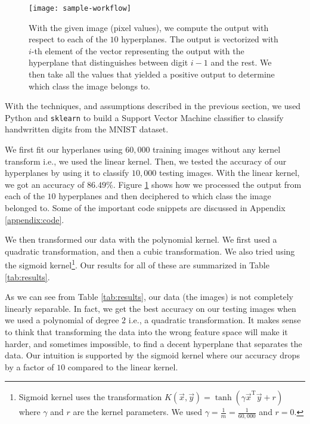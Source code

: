 
\begin{figure}[!tb]
	\texttt{[image: sample-workflow]}
	\centering
	\caption{With the given image (pixel values), we compute the output with respect to each of the $10$ hyperplanes. The output is vectorized with $i$-th element of the vector representing the output with the hyperplane that distinguishes between digit $i-1$ and the rest. We then take all the values that yielded a positive output to determine which class the image belongs to.}
	\label{fig:workflow}
\end{figure}

With the techniques, and assumptions described in the previous section, we used Python and \texttt{sklearn} to build a Support Vector Machine classifier to classify handwritten digits from the MNIST dataset.

We first fit our hyperlanes using $60,000$ training images without any kernel transform i.e., we used the linear kernel. Then, we tested the accuracy of our hyperplanes by using it to classify $10,000$ testing images. With the linear kernel, we got an accuracy of $86.49 \%$. Figure \ref{fig:workflow} shows how we processed the output from each of the $10$ hyperplanes and then deciphered to which class the image belonged to. Some of the important code snippets are discussed in Appendix \ref{appendix:code}.

We then transformed our data with the polynomial kernel. We first used a quadratic transformation, and then a cubic transformation. We also tried using the sigmoid kernel\footnote{Sigmoid kernel uses the transformation $K(\vec{x}, \vec{y}) = \tanh(\gamma\vec{x}^{\text{T}}\vec{y} + r)$ where $\gamma$ and $r$ are the kernel parameters. We used $\gamma=\frac{1}{m}=\frac{1}{60,000}$ and $r=0$.}. Our results for all of these are summarized in Table \ref{tab:results}.

As we can see from Table \ref{tab:results}, our data (the images) is not completely linearly separable. In fact, we get the best accuracy on our testing images when we used a polynomial of degree $2$ i.e., a quadratic transformation. It makes sense to think that transforming the data into the wrong feature space will make it harder, and sometimes impossible, to find a decent hyperplane that separates the data. Our intuition is supported by the sigmoid kernel where our accuracy drops by a factor of $10$ compared to the linear kernel.

